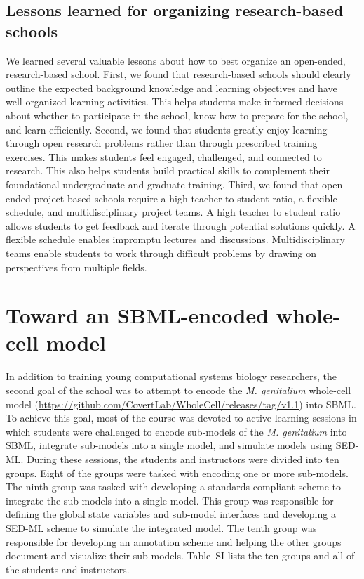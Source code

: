 \documentclass[journal,transmag]{IEEEtran}
\begin{document}
\subsection{Lessons learned for organizing research-based schools}
We learned several valuable lessons about how to best organize an open-ended, research-based school. First, we found that research-based schools should clearly outline the expected background knowledge and learning objectives and have well-organized learning activities. This helps students make informed decisions about whether to participate in the school, know how to prepare for the school, and learn efficiently. Second, we found that students greatly enjoy learning through open research problems rather than through prescribed training exercises. This makes students feel engaged, challenged, and connected to research. This also helps students build practical skills to complement their foundational undergraduate and graduate training. Third, we found that open-ended project-based schools require a high teacher to student ratio, a flexible schedule, and multidisciplinary project teams. A high teacher to student ratio allows students to get feedback and iterate through potential solutions quickly. A flexible schedule enables impromptu lectures and discussions. Multidisciplinary teams enable students to work through difficult problems by drawing on perspectives from multiple fields. 

\section{Toward an SBML-encoded whole-cell model}
In addition to training young computational systems biology researchers, the second goal of the school was to attempt to encode the \textit{M. genitalium} whole-cell model (\url{https://github.com/CovertLab/WholeCell/releases/tag/v1.1}) into SBML. To achieve this goal, most of the course was devoted to active learning sessions in which students were challenged to encode sub-models of the \textit{M. genitalium} into SBML, integrate sub-models into a single model, and simulate models using SED-ML. During these sessions, the students and instructors were divided into ten groups. Eight of the groups were tasked with encoding one or more sub-models. The ninth group was tasked with developing a standards-compliant scheme to integrate the sub-models into a single model. This group was responsible for defining the global state variables and sub-model interfaces and developing a SED-ML scheme to simulate the integrated model. The tenth group was responsible for developing an annotation scheme and helping the other groups document and visualize their sub-models. Table~SI lists the ten groups and all of the students and instructors. 
\end{document}
